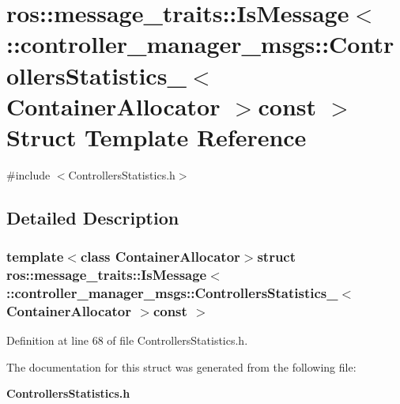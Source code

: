 \section{ros\-:\-:message\-\_\-traits\-:\-:\-Is\-Message$<$ \-:\-:controller\-\_\-manager\-\_\-msgs\-:\-:\-Controllers\-Statistics\-\_\-$<$ \-Container\-Allocator $>$const $>$ \-Struct \-Template \-Reference}
\label{structros_1_1message__traits_1_1IsMessage_3_01_1_1controller__manager__msgs_1_1ControllersStatisc708de6b386986caba1a5d3a66549338}


{\ttfamily \#include $<$\-Controllers\-Statistics.\-h$>$}



\subsection{\-Detailed \-Description}
\subsubsection*{template$<$class Container\-Allocator$>$struct ros\-::message\-\_\-traits\-::\-Is\-Message$<$ \-::controller\-\_\-manager\-\_\-msgs\-::\-Controllers\-Statistics\-\_\-$<$ Container\-Allocator $>$const  $>$}



\-Definition at line 68 of file \-Controllers\-Statistics.\-h.



\-The documentation for this struct was generated from the following file\-:\begin{DoxyCompactItemize}
\item 
{\bf \-Controllers\-Statistics.\-h}\end{DoxyCompactItemize}
